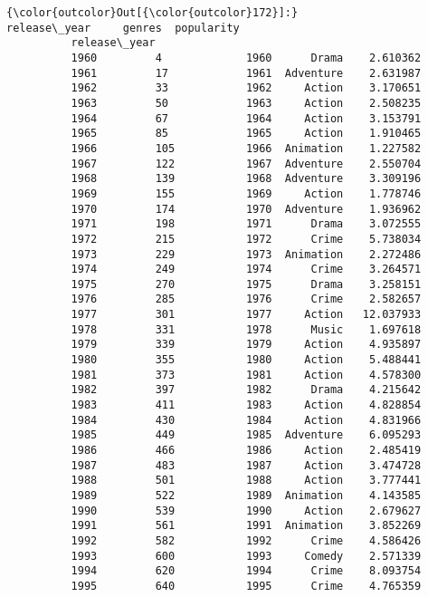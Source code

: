 \documentclass[11pt]{article}
\begin{document}
\begin{Verbatim}[commandchars=\\\{\}]
{\color{outcolor}Out[{\color{outcolor}172}]:}                    release\_year     genres  popularity
          release\_year                                          
          1960         4             1960      Drama    2.610362
          1961         17            1961  Adventure    2.631987
          1962         33            1962     Action    3.170651
          1963         50            1963     Action    2.508235
          1964         67            1964     Action    3.153791
          1965         85            1965     Action    1.910465
          1966         105           1966  Animation    1.227582
          1967         122           1967  Adventure    2.550704
          1968         139           1968  Adventure    3.309196
          1969         155           1969     Action    1.778746
          1970         174           1970  Adventure    1.936962
          1971         198           1971      Drama    3.072555
          1972         215           1972      Crime    5.738034
          1973         229           1973  Animation    2.272486
          1974         249           1974      Crime    3.264571
          1975         270           1975      Drama    3.258151
          1976         285           1976      Crime    2.582657
          1977         301           1977     Action   12.037933
          1978         331           1978      Music    1.697618
          1979         339           1979     Action    4.935897
          1980         355           1980     Action    5.488441
          1981         373           1981     Action    4.578300
          1982         397           1982      Drama    4.215642
          1983         411           1983     Action    4.828854
          1984         430           1984     Action    4.831966
          1985         449           1985  Adventure    6.095293
          1986         466           1986     Action    2.485419
          1987         483           1987     Action    3.474728
          1988         501           1988     Action    3.777441
          1989         522           1989  Animation    4.143585
          1990         539           1990     Action    2.679627
          1991         561           1991  Animation    3.852269
          1992         582           1992      Crime    4.586426
          1993         600           1993     Comedy    2.571339
          1994         620           1994      Crime    8.093754
          1995         640           1995      Crime    4.765359

\end{Verbatim}
\end{document}
